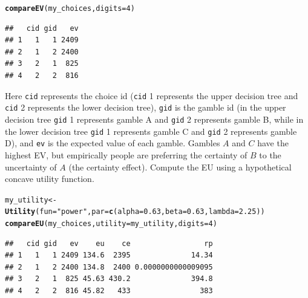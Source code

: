 \documentclass{article}\usepackage[]{graphicx}\usepackage[]{color}
\makeatletter
\newcommand{\hlnum}[1]{\textcolor[rgb]{0.686,0.059,0.569}{#1}}%
\newcommand{\hlstr}[1]{\textcolor[rgb]{0.192,0.494,0.8}{#1}}%
\newcommand{\hlstd}[1]{\textcolor[rgb]{0.345,0.345,0.345}{#1}}%
\newcommand{\hlkwb}[1]{\textcolor[rgb]{0.69,0.353,0.396}{#1}}%
\newcommand{\hlkwc}[1]{\textcolor[rgb]{0.333,0.667,0.333}{#1}}%
\newcommand{\hlkwd}[1]{\textcolor[rgb]{0.737,0.353,0.396}{\textbf{#1}}}%
\newenvironment{kframe}{%
 \def\at@end@of@kframe{}%
 \ifinner\ifhmode%
  \def\at@end@of@kframe{\end{minipage}}%
  \begin{minipage}{\columnwidth}%
 \fi\fi%
 \def\FrameCommand##1{\hskip\@totalleftmargin \hskip-\fboxsep
 \colorbox{shadecolor}{##1}\hskip-\fboxsep
     \hskip-\linewidth \hskip-\@totalleftmargin \hskip\columnwidth}%
 \MakeFramed {\advance\hsize-\width
   \@totalleftmargin\z@ \linewidth\hsize
   \@setminipage}}%
 {\par\unskip\endMakeFramed%
 \at@end@of@kframe}
\newenvironment{knitrout}{}{} %
\makeatother
\begin{document}
\begin{knitrout}
\color{fgcolor}\begin{kframe}
\begin{alltt}
\hlkwd{compareEV}\hlstd{(my_choices,} \hlkwc{digits}\hlstd{=}\hlnum{4}\hlstd{)}
\end{alltt}
\begin{verbatim}
##   cid gid   ev
## 1   1   1 2409
## 2   1   2 2400
## 3   2   1  825
## 4   2   2  816
\end{verbatim}
\end{kframe}
\end{knitrout}


Here {\tt cid} represents the choice id ({\tt cid} 1 represents the upper decision tree and {\tt cid} 2 represents the lower decision tree), {\tt gid} is the gamble id (in the upper decision tree {\tt gid} 1 represents gamble A and {\tt gid} 2 represents gamble B, while in the lower decision tree {\tt gid} 1 represents gamble C and {\tt gid} 2 represents gamble D), and {\tt ev} is the expected value of each gamble. Gambles $A$ and $C$ have the highest EV, but empirically people are preferring the certainty of $B$ to the uncertainty of $A$ (the certainty effect). Compute the EU using a hypothetical concave utility function.

\begin{knitrout}
\color{fgcolor}\begin{kframe}
\begin{alltt}
\hlstd{my_utility} \hlkwb{<-} \hlkwd{Utility}\hlstd{(}\hlkwc{fun}\hlstd{=}\hlstr{"power"}\hlstd{,} \hlkwc{par}\hlstd{=}\hlkwd{c}\hlstd{(}\hlkwc{alpha}\hlstd{=}\hlnum{0.63}\hlstd{,} \hlkwc{beta}\hlstd{=}\hlnum{0.63}\hlstd{,} \hlkwc{lambda}\hlstd{=}\hlnum{2.25}\hlstd{))}
\hlkwd{compareEU}\hlstd{(my_choices,} \hlkwc{utility}\hlstd{=my_utility,} \hlkwc{digits}\hlstd{=}\hlnum{4}\hlstd{)}
\end{alltt}
\begin{verbatim}
##   cid gid   ev    eu    ce                 rp
## 1   1   1 2409 134.6  2395              14.34
## 2   1   2 2400 134.8  2400 0.0000000000009095
## 3   2   1  825 45.63 430.2              394.8
## 4   2   2  816 45.82   433                383
\end{verbatim}
\end{kframe}
\end{knitrout}
\end{document}

